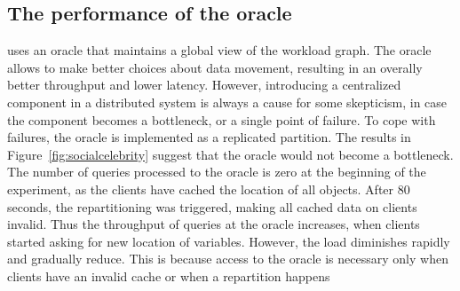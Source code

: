 
\subsection{The performance of the oracle}

\dynastar  uses an oracle that maintains a global view of the workload graph. The oracle allows
\dynastar to make better choices about data movement, resulting in an overally
better throughput and lower latency. However, introducing a centralized
component in a distributed system is always a cause for some skepticism,
in case the component becomes a bottleneck, or a single point of failure. 
To cope with failures, the oracle is implemented as a replicated partition. 
The results in Figure~\ref{fig:socialcelebrity} suggest that the oracle would not become a bottleneck.
The number of queries processed to the oracle is zero at the 
beginning of the experiment, as the clients have cached the location of all objects.
After 80 seconds, the repartitioning was triggered, making all cached data on clients invalid.
Thus the throughput of queries at the oracle increases, when clients started asking for new location of variables.
However, the load diminishes rapidly and gradually reduce. This is because access to the oracle is necessary only
when clients have an invalid cache or when a repartition happens


